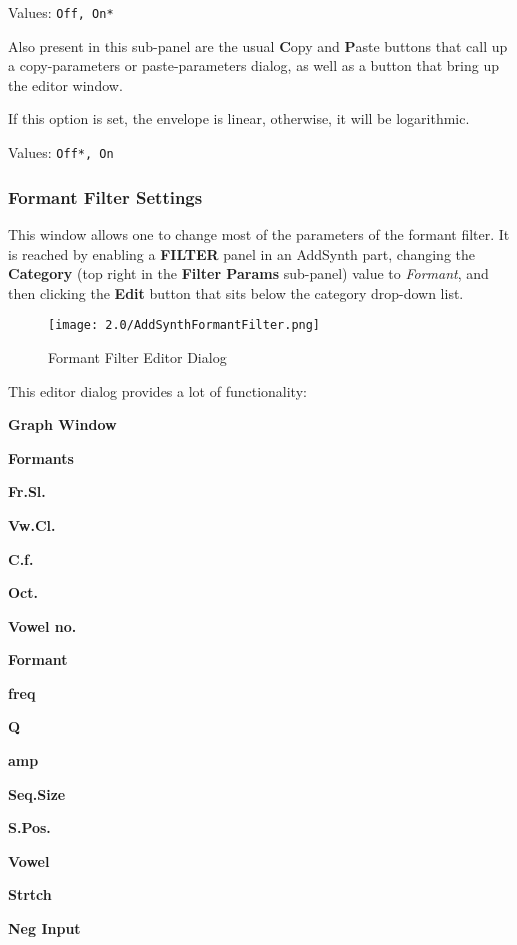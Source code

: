    Values: \texttt{Off, On*}

   Also present in this sub-panel are the usual \textbf{C}opy
   and \textbf{P}aste buttons that call up a copy-parameters or
   paste-parameters dialog, as well as a button that bring up the editor
   window.


   If this option is set, the envelope is linear, otherwise, it will be
   logarithmic.

   Values: \texttt{Off*, On}

\subsubsection{Formant Filter Settings}
\label{subsubsec:formant_filter_settings}

   This window allows one to change most of the parameters of the formant
   filter.   It is reached by enabling a \textbf{FILTER} panel in an AddSynth
   part,
   changing the \textbf{Category} (top right in the \textbf{Filter Params}
   sub-panel) value to \textsl{Formant}, and then clicking
   the \textbf{Edit} button that sits below the category drop-down list.

\begin{figure}[H]
   \centering
   \texttt{[image: 2.0/AddSynthFormantFilter.png]}
   \caption[Formant Filter Editor]{Formant Filter Editor Dialog}
   \label{fig:formant_filter_editor}
\end{figure}

   This editor dialog provides a lot of functionality:

   \begin{enumber}
      \item \textbf{Graph Window}
      \item \textbf{Formants}
      \item \textbf{Fr.Sl.}
      \item \textbf{Vw.Cl.}
      \item \textbf{C.f.}
      \item \textbf{Oct.}
      \item \textbf{Vowel no.}
      \item \textbf{Formant}
      \item \textbf{freq}
      \item \textbf{Q}
      \item \textbf{amp}
      \item \textbf{Seq.Size}
      \item \textbf{S.Pos.}
      \item \textbf{Vowel}
      \item \textbf{Strtch}
      \item \textbf{Neg Input}
   \end{enumber}

